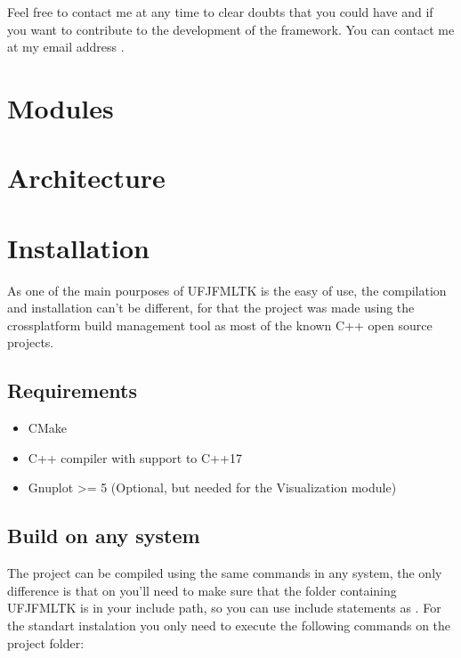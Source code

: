 \documentclass[letterpaper,10pt,english]{sphinxmanual}
\begin{document}
\sphinxAtStartPar
{}

\sphinxAtStartPar
Feel free to contact me at any time to clear doubts that you could have and if you want to contribute to the development of the framework. You can contact me at my e\sphinxhyphen{}mail address .


\chapter{Modules}
\label{\detokenize{overview/modules:modules}}\label{\detokenize{overview/modules::doc}}

\chapter{Architecture}
\label{\detokenize{overview/architecture:architecture}}\label{\detokenize{overview/architecture::doc}}

\chapter{Installation}
\label{\detokenize{getting_started/installation:installation}}\label{\detokenize{getting_started/installation::doc}}
\sphinxAtStartPar
As one of the main pourposes of UFJF\sphinxhyphen{}MLTK is the easy of use, the compilation and installation can’t be different, for
that the project was made using the cross\sphinxhyphen{}platform build management tool  as most of the known C++ open source
projects.


\section{Requirements}
\label{\detokenize{getting_started/installation:requirements}}\begin{itemize}
\item {} 
\sphinxAtStartPar
CMake

\item {} 
\sphinxAtStartPar
C++ compiler with support to C++17

\item {} 
\sphinxAtStartPar
Gnuplot \textgreater{}= 5 (Optional, but needed for the Visualization module)

\end{itemize}


\section{Build on any system}
\label{\detokenize{getting_started/installation:build-on-any-system}}
\sphinxAtStartPar
The project can be compiled using the same commands in any system, the only difference is that on  you’ll need
to make sure that the folder containing UFJF\sphinxhyphen{}MLTK is in your include path, so you can use include statements as
. For the standart instalation you only need to execute the following commands on
the project folder:
\end{document}
